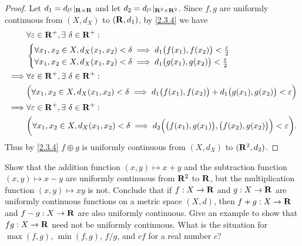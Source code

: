 \begin{proof}
  Let \(d_1 = d_{l^1}|_{\mathbf{R} \times \mathbf{R}}\) and let \(d_2 = d_{l^1}|_{\mathbf{R}^2 \times \mathbf{R}^2}\).
  Since \(f, g\) are uniformly continuous from \((X, d_X)\) to \((\mathbf{R}, d_1)\), by \cref{2.3.4} we have
  \begin{align*}
             & \forall \varepsilon \in \mathbf{R}^+, \exists\ \delta \in \mathbf{R}^+ :                                                                                           \\
             & \begin{cases}
                 \forall x_1, x_2 \in X, d_X(x_1, x_2) < \delta \implies d_1\big(f(x_1), f(x_2)\big) < \frac{\varepsilon}{2} \\
                 \forall x_1, x_2 \in X, d_X(x_1, x_2) < \delta \implies d_1\big(g(x_1), g(x_2)\big) < \frac{\varepsilon}{2}
               \end{cases}                                        \\
    \implies & \forall \varepsilon \in \mathbf{R}^+, \exists\ \delta \in \mathbf{R}^+ :                                                                                           \\
             & \Big(\forall x_1, x_2 \in X, d_X(x_1, x_2) < \delta \implies d_1\big(f(x_1), f(x_2)\big) + d_1\big(g(x_1), g(x_2)\big) < \varepsilon\Big)          \\
    \implies & \forall \varepsilon \in \mathbf{R}^+, \exists\ \delta \in \mathbf{R}^+ :                                                                                           \\
             & \bigg(\forall x_1, x_2 \in X, d_X(x_1, x_2) < \delta \implies d_2\Big(\big(f(x_1), g(x_1)\big), \big(f(x_2), g(x_2)\big)\Big) < \varepsilon\bigg).
  \end{align*}
  Thus by \cref{2.3.4} \(f \oplus g\) is uniformly continuous from \((X, d_X)\) to \((\mathbf{R}^2, d_2)\).
\end{proof}

\begin{exercise}\label{ex 2.3.6}
  Show that the addition function \((x, y) \mapsto x + y\) and the subtraction function \((x, y) \mapsto x - y\) are uniformly continuous from \(\mathbf{R}^2\) to \(\mathbf{R}\), but the multiplication function \((x, y) \mapsto xy\) is not.
  Conclude that if \(f : X \to \mathbf{R}\) and \(g : X \to \mathbf{R}\) are uniformly continuous functions on a metric space \((X, d)\), then \(f + g : X \to \mathbf{R}\) and \(f - g : X \to \mathbf{R}\) are also uniformly continuous.
  Give an example to show that \(fg : X \to \mathbf{R}\) need not be uniformly continuous.
  What is the situation for \(\max(f, g)\), \(\min(f, g)\), \(f / g\), and \(cf\) for a real number \(c\)?
\end{exercise}

